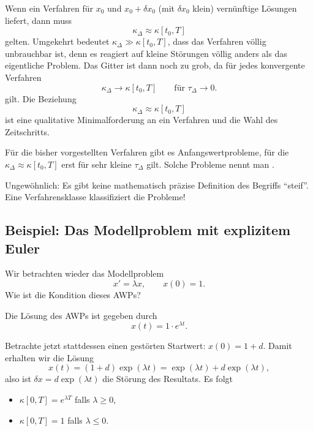 Wenn ein Verfahren für $x_0$ und $x_0 + \delta x_0$ (mit $\delta x_0$ klein) vernünftige Lösungen liefert, dann muss
\begin{equation*}
	\kappa_\Delta \approx \kappa [t_0, T]
\end{equation*}
gelten.
Umgekehrt bedeutet $\kappa_\Delta \gg \kappa [t_0,T]$, dass das Verfahren völlig unbrauchbar ist, denn es reagiert auf kleine Störungen völlig anders als das eigentliche Problem.
Das Gitter ist dann noch zu grob, da für jedes konvergente Verfahren
\begin{equation*}
	\kappa_\Delta \to \kappa [t_0,T]
	\qquad
	\text{für $\tau_\Delta \to 0$}.
\end{equation*}
gilt.
Die Beziehung
\begin{equation*}
 \kappa_\Delta \approx \kappa [t_0,T]
\end{equation*}
ist eine qualitative Minimalforderung an ein Verfahren und die Wahl des Zeitschritts.
\begin{definition}[Steifheit]
	Für die bisher vorgestellten Verfahren gibt es Anfangswertprobleme, für
	die $\kappa_\Delta \approx \kappa [t_0,T]$ erst für sehr kleine $\tau_\Delta$ gilt.
	Solche Probleme nennt man .
\end{definition}

Ungewöhnlich: Es gibt keine mathematisch präzise Definition des Begriffs \enquote{steif}. Eine Verfahrensklasse klassifiziert die Probleme!


\subsection{Beispiel: Das Modellproblem mit explizitem Euler}

Wir betrachten wieder das Modellproblem
\begin{equation*}
	x' = \lambda x,
	\qquad
	x(0) = 1.
\end{equation*}
Wie ist die Kondition dieses AWPs?

Die Lösung des AWPs ist gegeben durch
\begin{equation*}
	x(t) = 1 \cdot e^{\lambda t}.
\end{equation*}

Betrachte jetzt stattdessen einen gestörten Startwert: $x(0)= 1 + d$.
Damit erhalten wir die Lösung
\begin{equation*}
	x(t)= (1+d) \exp ( \lambda t ) = \exp(\lambda t) + d\exp(\lambda t),
\end{equation*}
also ist $\delta x = d \exp ( \lambda t )$ die Störung des Resultats.
Es folgt
\begin{itemize}
	\item $\kappa [0,T] = e^{\lambda T}$ falls $\lambda \ge 0$,
	\item $\kappa [0,T] = 1$ falls $\lambda \le 0$.
\end{itemize}

